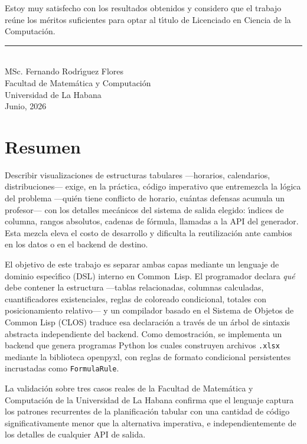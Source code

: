 \documentclass[12pt,a4paper]{report}
\theoremstyle{defstyle}
\newcommand{\xlsx}{\texttt{.xlsx}}
\begin{document}
Estoy muy satisfecho con los resultados obtenidos y considero que el trabajo
re\'une los m\'eritos suficientes para optar al t\'{\i}tulo de Licenciado en
Ciencia de la Computaci\'on.

\vspace{2cm}
\begin{flushright}
\rule{6cm}{0.4pt}\\
MSc. Fernando Rodr\'{\i}guez Flores\\
Facultad de Matem\'atica y Computaci\'on\\
Universidad de La Habana\\
Junio, 2026
\end{flushright}
\newpage

\chapter*{Resumen}
\thispagestyle{plain}

Describir visualizaciones de estructuras tabulares ---horarios, calendarios,
distribuciones--- exige, en la pr\'actica, c\'odigo imperativo que entremezcla
la l\'ogica del problema ---qui\'en tiene conflicto de horario, cu\'antas
defensas acumula un profesor--- con los detalles mec\'anicos del sistema de
salida elegido: \'{\i}ndices de columna, rangos absolutos, cadenas de f\'ormula,
llamadas a la API del generador.  Esta mezcla eleva el costo de desarrollo y
dificulta la reutilizaci\'on ante cambios en los datos o en el backend de destino.

El objetivo de este trabajo es separar ambas capas mediante un lenguaje de
dominio espec\'{\i}fico (DSL) interno en Common~Lisp.  El programador declara
\emph{qu\'e} debe contener la estructura ---tablas relacionadas, columnas
calculadas, cuantificadores existenciales, reglas de coloreado condicional,
totales con posicionamiento relativo--- y un compilador basado en el Sistema de
Objetos de Common Lisp (CLOS) traduce esa declaraci\'on a trav\'es de un \'arbol
de sintaxis abstracta independiente del backend.  Como demostraci\'on, se
implementa un backend que genera programas Python los cuales construyen archivos
\xlsx{} mediante la biblioteca openpyxl, con reglas de formato condicional
persistentes incrustadas como \texttt{FormulaRule}.

La validaci\'on sobre tres casos reales de la Facultad de Matem\'atica y
Computaci\'on de la Universidad de La Habana confirma que el lenguaje captura
los patrones recurrentes de la planificaci\'on tabular con una cantidad
de c\'odigo significativamente menor que la alternativa imperativa, e
independientemente de los detalles de cualquier API de salida.
\end{document}
